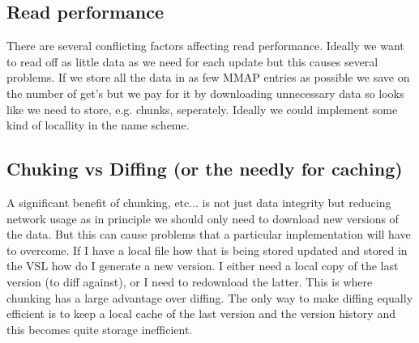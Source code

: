 \documentclass[10pt]{article}
\begin{document}
\subsection{Read performance}

There are several conflicting factors affecting read performance.  Ideally we want to read off as little data as we need for each update but this causes several problems.   If we store all the data in as few MMAP entries as possible we save on the number of get's but we pay for it by downloading unnecessary data so looks like we need to store, e.g. chunks, seperately.  Ideally we could implement some kind of locallity in the name scheme.

\subsection{Chuking vs Diffing (or the needly for caching)}

A significant benefit of chunking, etc... is not just data integrity but reducing network usage as in principle we should only need to download new versions of the data.  But this can cause problems that a particular implementation will have to overcome.  If I have a local file how that is being stored updated and stored in the VSL how do I generate a new version.  I either need a local copy of the last version (to diff against), or I need to redownload the latter.  This is where chunking has a large advantage over diffing.  The only way to make diffing equally efficient is to keep a local cache of the last version and the version history and this becomes quite storage inefficient.
\end{document}

